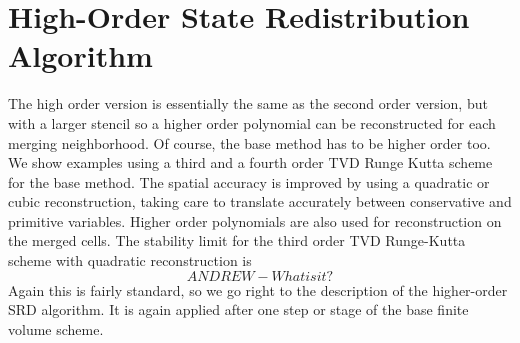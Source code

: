 \section{High-Order State Redistribution Algorithm}\label{sec:ho}

The high order version is essentially the same as the second order
version, but with a larger stencil so a higher order polynomial can be
reconstructed for each merging neighborhood. Of course, the base method
has to be higher order too. We show examples using
a third and a fourth order TVD Runge Kutta scheme
for the base method.  The spatial accuracy is improved by using a
quadratic or cubic reconstruction, taking care to translate
accurately between conservative and primitive variables.  Higher
order polynomials are also used for reconstruction on the merged cells. 
The stability limit for the third order TVD Runge-Kutta scheme with
quadratic reconstruction is
\begin{equation}
ANDREW - What is it?
\end{equation}
Again this is fairly standard, so we go right to the description of the higher-order SRD algorithm.
It is again applied after one step or stage of the base finite volume scheme.
